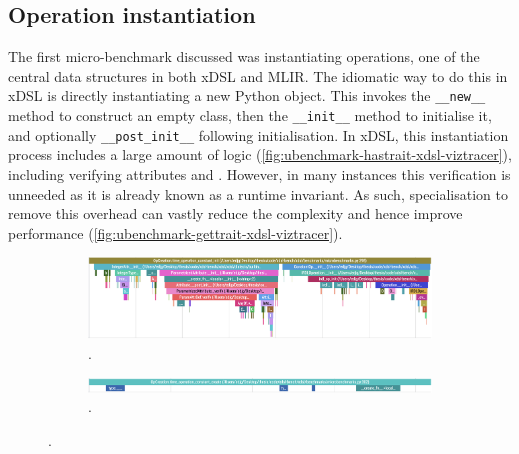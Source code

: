\subsection{Operation instantiation}
\label{sec:specialising-ubenchmarks-instantiation}

The first micro-benchmark discussed was instantiating operations, one of the central data structures in both xDSL and MLIR.
The idiomatic way to do this in xDSL is directly instantiating a new Python object.
This invokes the \texttt{__new__} method to construct an empty class, then the \texttt{__init__} method to initialise it, and optionally \texttt{__post_init__} following initialisation.
In xDSL, this instantiation process includes a large amount of logic (\autoref{fig:ubenchmark-hastrait-xdsl-viztracer}), including verifying attributes and .
However, in many instances this verification is unneeded as it is already known as a runtime invariant.
As such, specialisation to remove this overhead can vastly reduce the complexity and hence improve performance (\autoref{fig:ubenchmark-gettrait-xdsl-viztracer}).

\begin{figure}[H]
    \centering
    \begin{subfigure}[b]{\textwidth}
        \centering
        \includegraphics[width=\textwidth]{images/specialising_optimising_xdsl_rewriting/original_constant_create.png}
        \captionsetup{width=0.8\textwidth}
        \caption{.}
        \label{fig:ubenchmark-hastrait-xdsl-viztracer}
    \end{subfigure}
    \begin{subfigure}[b]{\textwidth}
        \centering
        \includegraphics[width=\textwidth]{images/specialising_optimising_xdsl_rewriting/optimised_constant_create.png}
        \captionsetup{width=0.8\textwidth}
        \caption{.}
        \label{fig:ubenchmark-gettrait-xdsl-viztracer}
    \end{subfigure}
    \caption{.}
    \label{fig:ubenchmark-hasgettrait-xdsl-viztracer}
\end{figure}

